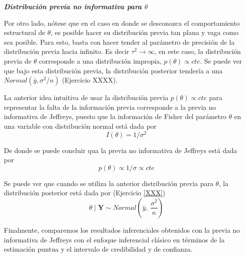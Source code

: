     \textbf{\emph{Distribuci\'on previa no informativa para $\theta$}}
    
    Por otro lado, n\'otese que en el caso en donde se desconozca el comportamiento estructural de $\theta$, es posible hacer su distribuci\'on previa tan plana y vaga como sea posible. Para esto, basta con hacer tender al par\'ametro de precisi\'on de la distribuci\'on previa hacia infinito. Es decir $\tau^2 \longrightarrow \infty$, en este caso, la distribuci\'on previa de $\theta$ corresponde a una distribuci\'on impropia, $p(\theta)\propto cte$. Se puede ver que bajo esta distribuci\'on previa, la distribuci\'on posterior tender\'ia a una $Normal(\bar{y},\sigma^2/n)$ (Ejercicio XXXX).
    
    La anterior idea intuitiva de usar la distribuci\'on previa $p(\theta)\propto cte$ para representar la falta de la informaci\'on previa corresponde a la previa no informativa de Jeffreys, puesto que la informaci\'on de Fisher del par\'ametro $\theta$ en una variable con distribuci\'on normal est\'a dada por 
    \begin{equation*}
    I(\theta)=1/\sigma^2
    \end{equation*}
    
    De donde se puede concluir qua la previa no informativa de Jeffreys est\'a dada por 
    \begin{equation*}
    p(\theta)\propto 1/\sigma\propto cte
    \end{equation*}
    
    Se puede ver que cuando se utiliza la anterior distribuci\'on previa para $\theta$, la distribuci\'on posterior est\'a dada por (Ejercicio \ref{XXX})
    \begin{equation*}
    \theta\mid\mathbf{Y}\sim Normal\left(\bar{y},\ \dfrac{\sigma^2}{n}\right)
    \end{equation*}
    
    Finalmente, comparemos los resultados inferenciales obtenidos con la previa no informativa de Jeffreys con el enfoque inferencial cl\'asico en t\'erminos de la estimaci\'on puntua y el intervalo de credibilidad y de confianza.
    
